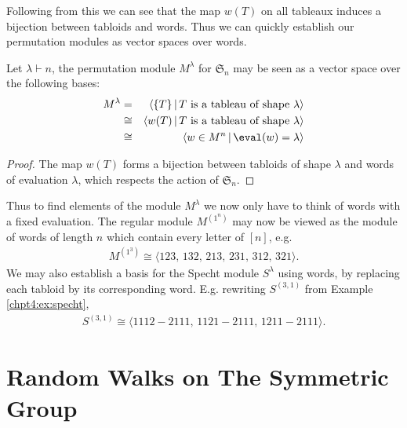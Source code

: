 \documentclass[11pt]{report}
\begin{document}
Following from this we can see that the map $w(T)$ on all tableaux induces a bijection between tabloids and words. Thus we can 
quickly establish our permutation modules as vector spaces over words.
\begin{lemma}
	Let $\lambda \vdash n$, the permutation module $M^{\lambda}$ for 
	$\mathfrak{S}_{n}$ may be seen as a vector 
	space over the following bases:
	\begin{eqnarray*}
		M^{\lambda} & = & \langle \{T\} \,|\, T \textnormal{ is a tableau of 
			shape 
		} 	\lambda \rangle \\
		& \cong & \langle w(T) \, | \,T \textnormal{ is a tableau of shape } 	
		\lambda \rangle \\ 
		& \cong & \langle w \in M^{n} \, | \,\eval(w) = \lambda \rangle
	\end{eqnarray*}  
\end{lemma}
\begin{proof}
	The map $w(T)$ forms a bijection between tabloids of shape $\lambda$ and 
	words of evaluation $\lambda$, which respects the action of 
	$\mathfrak{S}_{n}$.	
\end{proof}
Thus to find elements of the module $M^{\lambda}$ we now only have to think 
of words with a fixed evaluation. The regular module $M^{(1^{n})}$ may now be viewed as the module of words of length $n$ which contain every letter of $[n]$, e.g.
\begin{eqnarray}	
M^{(1^{3})} \cong \langle 123, \, 132, \, 213, \, 231, \, 312, \, 321 \rangle.
\end{eqnarray}
We may also establish a basis for the Specht module 
$S^{\lambda}$  using words, by replacing each tabloid by its 
corresponding word. E.g. rewriting $S^{(3,1)}$ from Example \ref{chpt4:ex:specht},
\begin{eqnarray}	
S^{(3,1)} \cong \langle 1112 -2111, \, 1121 -2111, \, 1211 -2111 \rangle.
\end{eqnarray}




\section{Random Walks on The Symmetric Group}
\end{document}
